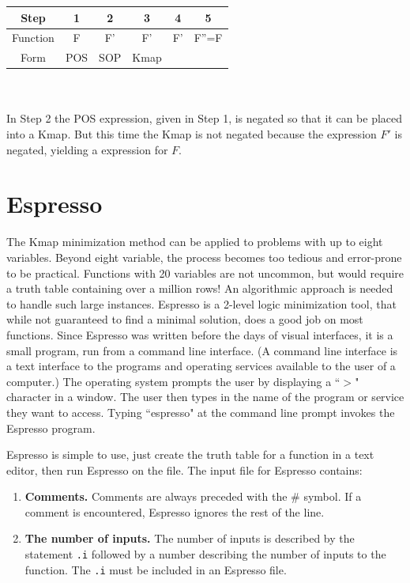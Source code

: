 \begin{process:minimizationKmap}
\begin{tabular}{|c|c|c|c|c|c|}\hline
Step	  & 1  & 2  & 3  & 4  & 5  \\ \hline
Function  & F  & F'  & F'  & F' &  F''=F \\ \hline
Form	  & POS & SOP & Kmap & \SOPmin & \POSmin \\ \hline
\end{tabular}
\\ \\
In Step 2 the POS expression, given in Step 1, is negated 
so that it can be placed into a Kmap.  But this time the Kmap is not
negated because the \SOPmin expression $F'$ is negated, yielding 
a \POSmin expression for $F$.

\section{Espresso}
The Kmap minimization method can be applied to problems with up to
eight variables.  Beyond eight variable, the process becomes too tedious and error-prone to
be practical.  Functions with 20 variables are not uncommon, but 
would require a truth table containing over a million rows!  An 
algorithmic approach is needed to handle such large instances.  
Espresso is a 2-level logic minimization tool, that while not 
guaranteed to find a minimal solution, does a good job on most 
functions.  Since Espresso was written before the days 
of visual interfaces, it is a small program, run from a command line interface.  
(A command line interface
is a text interface to the programs and operating services
available to the user of a computer.) The operating system prompts
the user by displaying a ``$>$" character in a window. The user
then types in the name of the program or service they want to 
access.  Typing ``espresso" at the command
line prompt invokes the Espresso program.

Espresso is simple to use, just create the truth table for 
a function in a text editor, then run Espresso on the file.
The input file for Espresso contains:
\begin{enumerate}
\item {\bf Comments.}  Comments are always preceded with 
the \# symbol.  If a comment is encountered, Espresso 
ignores the rest of the line.

\item {\bf The number of inputs.}
The number of inputs is 
described by the statement \verb+.i+ followed by a 
number describing the number of inputs to the function. 
The \verb+.i+  must be included in an Espresso file.


\end{enumerate}
\end{process:minimizationKmap}
